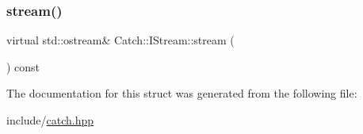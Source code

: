 \subsubsection{\texorpdfstring{stream()}{stream()}}
{\footnotesize\ttfamily virtual std\+::ostream\& Catch\+::\+I\+Stream\+::stream (\begin{DoxyParamCaption}{ }\end{DoxyParamCaption}) const\hspace{0.3cm}{\ttfamily [pure virtual]}}



The documentation for this struct was generated from the following file\+:\begin{DoxyCompactItemize}
\item 
include/\mbox{\hyperlink{catch_8hpp}{catch.\+hpp}}\end{DoxyCompactItemize}
